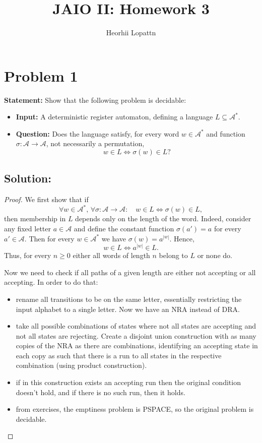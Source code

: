 \documentclass[12pt]{article}
\title{JAIO II: Homework 3}
\author{Heorhii Lopattn}
\date{}
\begin{document}
\maketitle

\section*{Problem 1}
\textbf{Statement:} Show that the following problem is decidable:  
\begin{itemize}
    \item \textbf{Input:} A deterministic register automaton, defining a language \(L \subseteq \mathcal{A}^*\).
    \item \textbf{Question:} Does the language satisfy, for every word \(w \in \mathcal{A}^*\) and function \(\sigma : \mathcal{A} \to \mathcal{A}\), not necessarily a permutation, 
    \[
    w \in L \iff \sigma(w) \in L?
    \]
\end{itemize}

\subsection*{Solution:}
\begin{proof}
We first show that if 
\[
\forall w\in\mathcal{A}^*,\,\forall\sigma:\mathcal{A}\to\mathcal{A}:\quad w\in L\iff \sigma(w)\in L,
\]
then membership in \(L\) depends only on the length of the word. Indeed, consider any fixed letter \(a\in \mathcal{A}\) and define the constant function \(\sigma(a')=a\) for every \(a'\in\mathcal{A}\). Then for every \(w\in \mathcal{A}^*\) we have \(\sigma(w)=a^{|w|}\). Hence,
\[
w\in L \iff a^{|w|}\in L.
\]
Thus, for every \(n\ge 0\) either all words of length \(n\) belong to \(L\) or none do. 

Now we need to check if all paths of a given length are either not accepting or all accepting. In order to do that: 

\begin{itemize}
\item rename all transitions to be on the same letter, essentially restricting the input alphabet to a single letter. Now we have an NRA instead of DRA.
\item take all possible combinations of states where not all states are accepting and not all states are rejecting. Create a disjoint union construction with as many copies of the NRA as there are combinations, identifying an accepting state in each copy as such that there is a run to all states in the respective combination (using product construction).
\item if in this construction exists an accepting run then the original condition doesn't hold, and if there is no such run, then it holds.
\item from exercises, the emptiness problem is PSPACE, so the original problem is decidable.
\end{itemize}
\end{proof}
\end{document}
